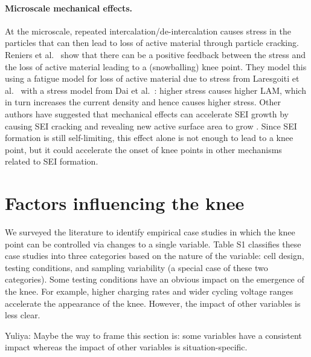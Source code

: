\documentclass{article}
\newcommand{\pbox}[1]{{
\fbox{
\parbox{0.8\textwidth}{  \fbox{$\triangleright$\textcolor{blue}{\textbf{From Peter}:}} 
#1
}}}}
\begin{document}
\paragraph{Microscale mechanical effects.}

\pbox{
Add covering layer stuff
}

At the microscale, repeated intercalation/de-intercalation causes stress in the particles that can then lead to loss of active material through particle cracking.
Reniers et al.~\cite{reniers_review_2019} show that there can be a positive feedback between the stress and the loss of active material leading to a (snowballing) knee point. They model this using a fatigue model for loss of active material due to stress from Laresgoiti et al.~\cite{laresgoiti_modeling_2015} with a stress model from Dai et al.~\cite{dai_simulation_2014}: higher stress causes higher LAM, which in turn increases the current density and hence causes higher stress.
Other authors have suggested that mechanical effects can accelerate SEI growth by causing SEI cracking and revealing new active surface area to grow \cite{kupper_end--life_2018,louli_operando_2019}. Since SEI formation is still self-limiting, this effect alone is not enough to lead to a knee point, but it could accelerate the onset of knee points in other mechanisms related to SEI formation.


\section{Factors influencing the knee}

We surveyed the literature to identify empirical case studies in which the knee point can be controlled via changes to a single variable. Table S1 classifies these case studies into three categories based on the nature of the variable: cell design, testing conditions, and sampling variability (a special case of these two categories). Some testing conditions have an obvious impact on the emergence of the knee. For example, higher charging rates and wider cycling voltage ranges accelerate the appearance of the knee. However, the impact of other variables is less clear. 

Yuliya: Maybe the way to frame this section is: some variables have a consistent impact whereas the impact of other variables is situation-specific.
\end{document}
